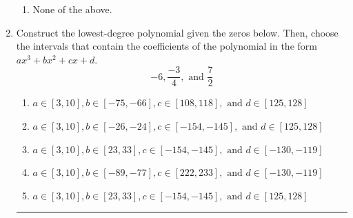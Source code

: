 \documentclass[14pt]{extbook}
\newcommand{\litem}[1]{\item#1\hspace*{-1cm}\rule{\textwidth}{0.4pt}}
\begin{document}
\begin{enumerate}
{\begin{enumerate}[label=\Alph*.]
\item None of the above.
\end{enumerate} }
\litem{
Construct the lowest-degree polynomial given the zeros below. Then, choose the intervals that contain the coefficients of the polynomial in the form $ax^3+bx^2+cx+d$.\[ -6, \frac{-3}{4}, \text{ and } \frac{7}{2} \]\begin{enumerate}[label=\Alph*.]
\item \( a \in [3, 10], b \in [-75, -66], c \in [108, 118], \text{ and } d \in [125, 128] \)
\item \( a \in [3, 10], b \in [-26, -24], c \in [-154, -145], \text{ and } d \in [125, 128] \)
\item \( a \in [3, 10], b \in [23, 33], c \in [-154, -145], \text{ and } d \in [-130, -119] \)
\item \( a \in [3, 10], b \in [-89, -77], c \in [222, 233], \text{ and } d \in [-130, -119] \)
\item \( a \in [3, 10], b \in [23, 33], c \in [-154, -145], \text{ and } d \in [125, 128] \)


\end{enumerate}}
\end{enumerate}
\end{document}
